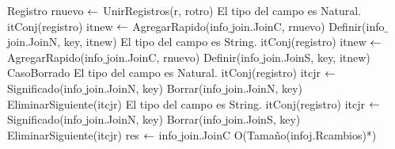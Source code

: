 {						\State	Registro rnuevo $\leftarrow$ UnirRegistros(r, rotro)
							\State	El tipo del campo es Natural.
							\State	itConj(registro) itnew $\leftarrow$ AgregarRapido(info$\_$join.JoinC, rnuevo)
							\State	Definir(info$\_$join.JoinN, key, itnew)
						\Else
							\State	El tipo del campo es String.
							\State	itConj(registro) itnew $\leftarrow$ AgregarRapido(info$\_$join.JoinC, rnuevo)
							\State	Definir(info$\_$join.JoinS, key, itnew)
						\EndIf
					\EndIf
				\Else	CasoBorrado
						\State	El tipo del campo es Natural.
						\State	itConj(registro) itcjr $\leftarrow$ Significado(info$\_$join.JoinN, key)
						\State	Borrar(info$\_$join.JoinN, key)
						\State	EliminarSiguiente(itcjr)
					\Else
						\State	El tipo del campo es String.
						\State	itConj(registro) itcjr $\leftarrow$ Significado(info$\_$join.JoinN, key)
						\State	Borrar(info$\_$join.JoinS, key)
						\State	EliminarSiguiente(itcjr)
					\EndIf
				\EndIf
		\EndWhile
	\EndIf
	\State res $\leftarrow$ info$\_$join.JoinC
}{O(Tamaño(infoj.Rcambios)*)}


